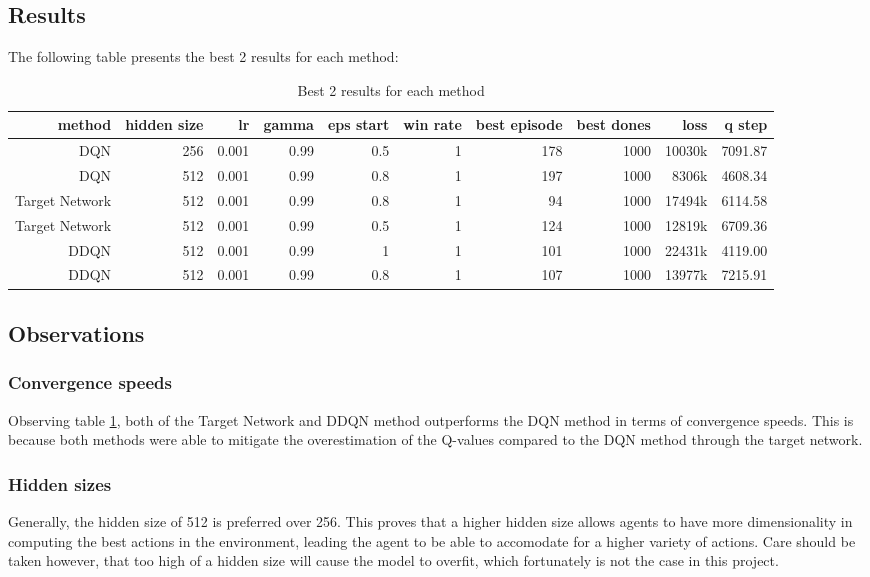 \subsection{Results}
The following table presents the best 2 results for each method:

\begin{table}[h]
	\centering
	\scriptsize
	\begin{tabular}{r r r r r | r r r r r}
		\toprule
              method & hidden size & lr & gamma & eps start & win rate & best episode & best dones & loss & q step \\
              \midrule
			DQN & 256 & 0.001 & 0.99 & 0.5 & 1 & 178 & 1000 & 10030k & 7091.87 \\
               DQN & 512 & 0.001 & 0.99 & 0.8 & 1 & 197 & 1000 & 8306k & 4608.34 \\
               Target Network & 512 & 0.001 & 0.99 & 0.8 & 1 & 94 & 1000 & 17494k & 6114.58 \\
               Target Network & 512 & 0.001 & 0.99 & 0.5 & 1 & 124 & 1000 & 12819k & 6709.36 \\
               DDQN & 512 & 0.001 & 0.99 & 1 & 1 & 101 & 1000 & 22431k & 4119.00 \\
               DDQN & 512 & 0.001 & 0.99 & 0.8 & 1 & 107 & 1000 & 13977k & 7215.91 \\
        \bottomrule
	\end{tabular}
	\caption{Best 2 results for each method}
	\label{best_results_t2}
\end{table}

\subsection{Observations}
\subsubsection{Convergence speeds}

Observing table \ref{best_results_t2}, both of the Target Network and DDQN method outperforms the DQN method in terms of convergence speeds. This is because both methods were able to mitigate the overestimation of the Q-values compared to the DQN method through the target network.

\subsubsection{Hidden sizes}
Generally, the hidden size of 512 is preferred over 256. This proves that a higher hidden size allows agents to have more dimensionality in computing the best actions in the environment, leading the agent to be able to accomodate for a higher variety of actions. Care should be taken however, that too high of a hidden size will cause the model to overfit, which fortunately is not the case in this project.

